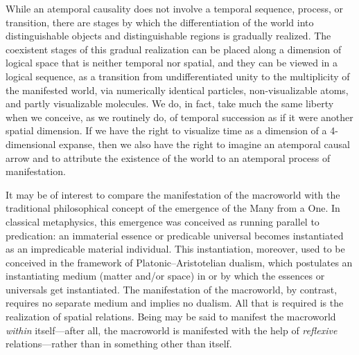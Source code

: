 While an atemporal causality does not involve a temporal sequence, process, or transition, there are stages by which the differentiation of the world into distinguishable objects and distinguishable regions is gradually realized. The coexistent stages of this gradual realization can be placed along a dimension of logical space that is neither temporal nor spatial, and they can be viewed in a logical sequence, as a transition from undifferentiated unity to the multiplicity of the manifested world, via numerically identical particles, non-visualizable atoms, and partly visualizable molecules. We do, in fact, take much the same liberty when we conceive, as we routinely do, of temporal succession as if it were another spatial dimension. If we have the right to visualize time as a dimension of a 4-dimensional expanse,  then we also have the right to imagine an atemporal causal arrow and to attribute the existence of the world to an atemporal process of manifestation.

It may be of interest to compare the manifestation of the macroworld with the traditional philosophical concept of the emergence of the Many from a One. In classical metaphysics, this emergence was conceived as running parallel to predication: an immaterial essence or predicable universal becomes instantiated as an impredicable material individual. This instantiation, moreover, used to be conceived in the framework of Platonic--Aristotelian dualism, which postulates an instantiating medium (matter and/or space) in or by which the essences or universals get instantiated. The manifestation of the macroworld, by contrast, requires no separate medium and implies no dualism. All that is required is the realization of spatial relations. Being may be said to manifest the macroworld \emph{within} itself---after all, the macroworld is manifested with the help of \emph{reflexive} relations---rather than in something other than itself.

